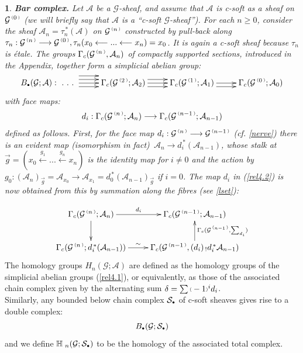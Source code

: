 \documentclass[a4paper]{article}
\newtheorem{num}[st]{}
\newcommand{\rmap}{\longrightarrow}
\newcommand{\lmap}{\longleftarrow}
\newcommand{\G}{\ensuremath{\mathcal{G}}}
\newcommand{\A}{\ensuremath{\mathcal{A}}}
\newcommand{\es}{\ensuremath{\mathcal{S}}}
\newcommand{\gc}{\ensuremath{\Gamma_c}}
\newcommand{\ps}{{\raise 1pt\hbox{\tiny (}}}
\newcommand{\pd}{{\raise 1pt\hbox{\tiny )}}}
\newcommand{\nG}[1]{\ensuremath{\G^{\,\ps #1\,\pd}}}
\def\cdot{{\raise 0.5pt\hbox{$\scriptscriptstyle\bullet$}}}
\begin{document}
\begin{num}
\label{bar}
\emph{
{\bf Bar complex.} Let $\A$ be a $\G$-sheaf, and assume that $\A$ is c-soft as a sheaf on $\nG{0}$ (we will briefly say that $\A$ is a ``c-soft $\G$-sheaf''). For each $n \geq 0$, consider the sheaf $\A_{n}= \tau_{n}^{\, *}(\A)$ on $\nG{n}$ constructed by pull-back along $\tau_{n}: \nG{n} \rmap \nG{0}, \tau_{n}( x_{0} \lmap . . . \lmap x_{n}) = x_{0}$. It is again a c-soft sheaf because $\tau_{n}$ is \'etale. The groups $\Gamma_{c}(\nG{n}, \A_{n})$ of compactly supported sections, introduced in the Appendix, together form a simplicial abelian group:
\begin{equation}
\label{rel4.1}
 \xymatrix {
B_{\cdot}(\G; \A): \  .\ .\ .\ \ar@<2ex>[r]\ar@<1ex>[r]\ar[r]\ar@<-1ex>[r] &\gc (\nG{2};\A_{2}) \ar@<1ex>[r]\ar[r]\ar@<-1ex>[r] & \gc(\nG{1};\A_{1}) \ar[r]\ar@<-1ex>[r] & \gc (\nG{0};\A_{0}) } 
\end{equation}
with face maps:
\begin{equation}
\label{rel4.2}
 d_{i}: \gc (\nG{n};\A_{n})  \rmap \gc (\nG{n-1};\A_{n-1})  
\end{equation}
defined as follows. First, for the face map $d_{i}: \nG{n} \rmap \nG{n-1}$ (cf. \ref{nerve}) there is an evident map (isomorphism in fact)\ $\A_{n} \rmap d_{i}^{\, *}(\A_{n-1}) $, whose stalk at $\stackrel{\rightarrow}{g}=(x_{0} \stackrel{g_{1}}{\lmap} . . . \stackrel{g_{n}}{\lmap} x_{n})$ is the identity map for $i \neq 0$ and the action by $g_{0}:  (\A_{n})_{\stackrel{\rightarrow}{g}} =  \A_{x_{0}} \rmap \A_{x_{1}} = d_{0}^{\, *}(\A_{n-1})_{\stackrel{\rightarrow}{g}}$ if $i= 0$. The map $d_{i}$ in (\ref{rel4.2}) is now obtained from this by summation along the fibres (see \ref{lset}):
} 
\end{num}

\[ \xymatrix {
\gc (\nG{n}; \A_{n})   \ar[r]^-{d_{i}} \ar[d] &  \gc (\nG{n-1}; \A_{n-1}) \\
\gc (\nG{n}; d_{i}^{\, *}(\A_{n-1})) \ar[r]^-{\sim} & \gc (\nG{n-1}, (d_{i})_{\, !}d_{i}^{\, *}\A_{n-1}) \ar[u]_-{\gc(\nG{n-1}, \sum_{d_{i}})} }\]
The homology groups $H_{n}(\G; \A)$ are defined as the homology groups of the simplicial abelian groups (\ref{rel4.1}), or equivalently, as those of the associated chain complex given by the alternating sum $\delta= \sum\ps -1\pd^{i}d_{i}$.\\
Similarly, any bounded below chain complex $\es_{\cdot}$ of c-soft sheaves gives rise to a double complex:
\begin{equation}
\label{rel4.3}
B_{\cdot}(\G; \es_{\cdot})
\end{equation}
and we define $\mathbb{H}_{\, \, n}(\G; \es_{\cdot})$ to be the homology of the associated total complex.
\end{document}
